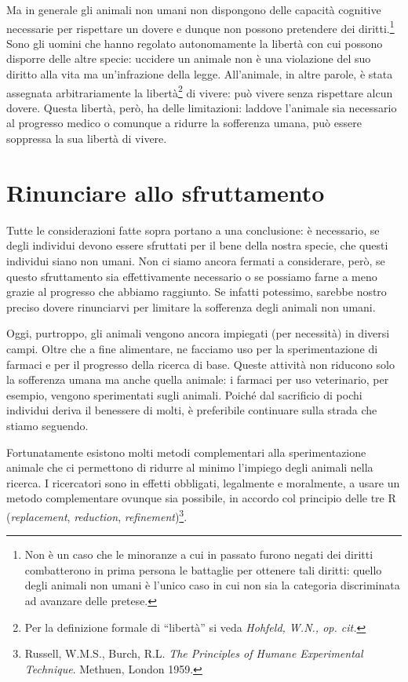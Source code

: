 \documentclass[a4paper,11pt,oneside,article]{memoir}
\begin{document}
Ma in generale gli animali non umani non dispongono delle capacità cognitive
necessarie per rispettare un dovere e dunque non possono pretendere dei
diritti.\footnote{Non è un caso che le minoranze a cui in passato furono negati
dei diritti combatterono in prima persona le battaglie per ottenere tali
diritti: quello degli animali non umani è l'unico caso in cui non sia la
categoria discriminata ad avanzare delle pretese.} Sono gli uomini che hanno
regolato autonomamente la libertà con cui possono disporre delle altre specie:
uccidere un animale non è una violazione del suo diritto alla vita ma
un'infrazione della legge. All'animale, in altre parole, è stata assegnata
arbitrariamente la libertà\footnote{Per la definizione formale di ``libertà'' si
veda \emph{Hohfeld, W.N., op. cit.}} di vivere: può vivere senza rispettare
alcun dovere. Questa libertà, però, ha delle limitazioni: laddove l'animale sia
necessario al progresso medico o comunque a ridurre la sofferenza umana, può
essere soppressa la sua libertà di vivere.

\chapter{Rinunciare allo sfruttamento}

Tutte le considerazioni fatte sopra portano a una conclusione: è necessario, se
degli individui devono essere sfruttati per il bene della nostra specie, che
questi individui siano non umani. Non ci siamo ancora fermati a considerare,
però, se questo sfruttamento sia effettivamente necessario o se possiamo farne a
meno grazie al progresso che abbiamo raggiunto. Se infatti potessimo, sarebbe
nostro preciso dovere rinunciarvi per limitare la sofferenza degli animali non
umani.

Oggi, purtroppo, gli animali vengono ancora impiegati (per necessità) in diversi
campi. Oltre che a fine alimentare, ne facciamo uso per la sperimentazione di
farmaci e per il progresso della ricerca di base. Queste attività non riducono
solo la sofferenza umana ma anche quella animale: i farmaci per uso veterinario,
per esempio, vengono sperimentati sugli animali. Poiché dal sacrificio di pochi
individui deriva il benessere di molti, è preferibile continuare sulla strada
che stiamo seguendo.

Fortunatamente esistono molti metodi complementari alla sperimentazione animale
che ci permettono di ridurre al minimo l'impiego degli animali nella ricerca. I
ricercatori sono in effetti obbligati, legalmente e moralmente, a usare un
metodo complementare ovunque sia possibile, in accordo col principio delle tre R
(\emph{replacement}, \emph{reduction}, \emph{refinement})\footnote{Russell,
W.M.S., Burch, R.L. \emph{The Principles of Humane Experimental Technique}.
Methuen, London 1959.}.
\end{document}
